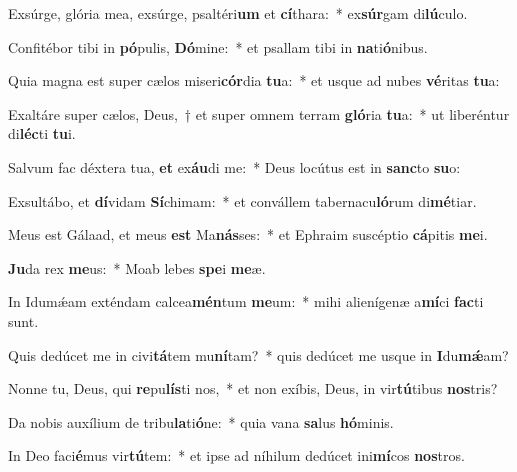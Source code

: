 \item Exsúrge, glória mea, exsúrge, psaltéri\textbf{um} et \textbf{cí}thara:~* ex\textbf{súr}gam di\textbf{lú}culo.
\item Confitébor tibi in \textbf{pó}pulis, \textbf{Dó}mine:~* et psallam tibi in \textbf{na}ti\textbf{ó}nibus.
\item Quia magna est super cælos miseri\textbf{cór}dia \textbf{tu}a:~* et usque ad nubes \textbf{vé}ritas \textbf{tu}a:
\item Exaltáre super cælos, Deus,~† et super omnem terram \textbf{gló}ria \textbf{tu}a:~* ut liberéntur di\textbf{léc}ti \textbf{tu}i.
\item Salvum fac déxtera tua, \textbf{et} ex\textbf{áu}di me:~* Deus locútus est in \textbf{sanc}to \textbf{su}o:
\item Exsultábo, et \textbf{dí}vidam \textbf{Sí}chimam:~* et convállem tabernacu\textbf{ló}rum di\textbf{mé}tiar.
\item Meus est Gálaad, et meus \textbf{est} Ma\textbf{nás}ses:~* et Ephraim suscéptio \textbf{cá}pitis \textbf{me}i.
\item \textbf{Ju}da rex \textbf{me}us:~* Moab lebes \textbf{spe}i \textbf{me}æ.
\item In Idumǽam exténdam calcea\textbf{mén}tum \textbf{me}um:~* mihi alienígenæ a\textbf{mí}ci \textbf{fac}ti sunt.
\item Quis dedúcet me in civi\textbf{tá}tem mu\textbf{ní}tam?~* quis dedúcet me usque in \textbf{I}du\textbf{mǽ}am?
\item Nonne tu, Deus, qui \textbf{re}pu\textbf{lís}ti nos,~* et non exíbis, Deus, in vir\textbf{tú}tibus \textbf{nos}tris?
\item Da nobis auxílium de tribu\textbf{la}ti\textbf{ó}ne:~* quia vana \textbf{sa}lus \textbf{hó}minis.
\item In Deo faci\textbf{é}mus vir\textbf{tú}tem:~* et ipse ad níhilum dedúcet ini\textbf{mí}cos \textbf{nos}tros.
